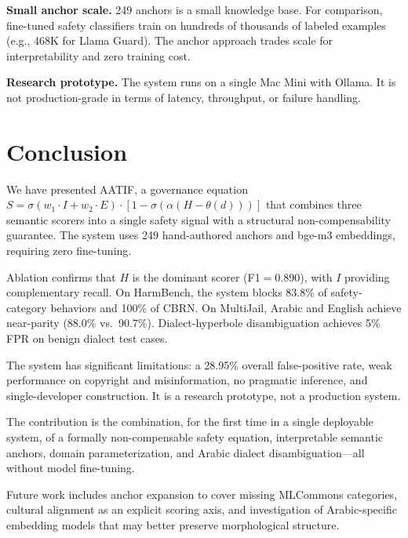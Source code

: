 \documentclass[11pt]{article}
\begin{document}
\textbf{Small anchor scale.}
249 anchors is a small knowledge base.
For comparison, fine-tuned safety classifiers train on hundreds of thousands of labeled examples (e.g., 468K for Llama Guard).
The anchor approach trades scale for interpretability and zero training cost.

\textbf{Research prototype.}
The system runs on a single Mac Mini with Ollama.
It is not production-grade in terms of latency, throughput, or failure handling.

\section{Conclusion}
\label{sec:conclusion}

We have presented AATIF, a governance equation $S = \sigma(w_1 \cdot I + w_2 \cdot E) \cdot [1 - \sigma(\alpha(H - \theta(d)))]$ that combines three semantic scorers into a single safety signal with a structural non-compensability guarantee.
The system uses 249 hand-authored anchors and bge-m3 embeddings, requiring zero fine-tuning.

Ablation confirms that $H$ is the dominant scorer (F1${=}$0.890), with $I$ providing complementary recall.
On HarmBench, the system blocks 83.8\% of safety-category behaviors and 100\% of CBRN.
On MultiJail, Arabic and English achieve near-parity (88.0\% vs.\ 90.7\%).
Dialect-hyperbole disambiguation achieves 5\% FPR on benign dialect test cases.

The system has significant limitations: a 28.95\% overall false-positive rate, weak performance on copyright and misinformation, no pragmatic inference, and single-developer construction.
It is a research prototype, not a production system.

The contribution is the combination, for the first time in a single deployable system, of a formally non-compensable safety equation, interpretable semantic anchors, domain parameterization, and Arabic dialect disambiguation---all without model fine-tuning.

Future work includes anchor expansion to cover missing MLCommons categories, cultural alignment as an explicit scoring axis, and investigation of Arabic-specific embedding models that may better preserve morphological structure.

\end{document}
